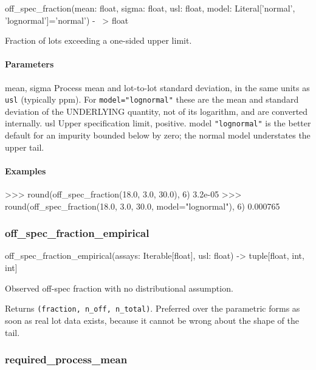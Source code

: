\documentclass[10pt,a4paper,twoside]{report}
\begin{document}
\begin{verbatimsmall}
off_spec_fraction(mean: float, sigma: float, usl: float, model: Literal['normal', 'lognormal']='normal') -
    \ > float
\end{verbatimsmall}

Fraction of lots exceeding a one-sided upper limit.

\paragraph*{Parameters}

mean, sigma Process mean and lot-to-lot standard deviation, in the same units as \texttt{usl} (typically ppm). For \texttt{model="lognormal"} these are the mean and standard deviation of the UNDERLYING quantity, not of its logarithm, and are converted internally. usl Upper specification limit, positive. model \texttt{"lognormal"} is the better default for an impurity bounded below by zero; the normal model understates the upper tail.

\paragraph*{Examples}

\begin{doctestblock}
>>> round(off_spec_fraction(18.0, 3.0, 30.0), 6)
3.2e-05
>>> round(off_spec_fraction(18.0, 3.0, 30.0, model="lognormal"), 6)
0.000765
\end{doctestblock}

\subsubsection*{off\_spec\_fraction\_empirical}

\begin{verbatimsmall}
off_spec_fraction_empirical(assays: Iterable[float], usl: float) -> tuple[float, int, int]
\end{verbatimsmall}

Observed off-spec fraction with no distributional assumption.

Returns \texttt{(fraction, n\_off, n\_total)}. Preferred over the parametric forms as soon as real lot data exists, because it cannot be wrong about the shape of the tail.

\subsubsection*{required\_process\_mean}
\end{document}
